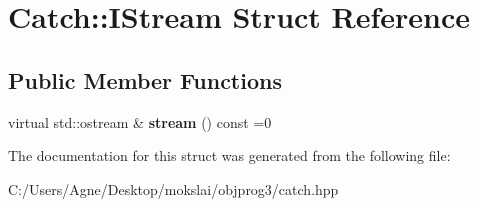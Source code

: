 \hypertarget{struct_catch_1_1_i_stream}{}\section{Catch\+:\+:I\+Stream Struct Reference}
\label{struct_catch_1_1_i_stream}
\subsection*{Public Member Functions}
\begin{DoxyCompactItemize}
\item 
\mbox{\label{struct_catch_1_1_i_stream_a55a9ddbe250261ff38642f480ebdd902}} 
virtual std\+::ostream \& {\bfseries stream} () const =0
\end{DoxyCompactItemize}


The documentation for this struct was generated from the following file\+:\begin{DoxyCompactItemize}
\item 
C\+:/\+Users/\+Agne/\+Desktop/mokslai/objprog3/catch.\+hpp\end{DoxyCompactItemize}
